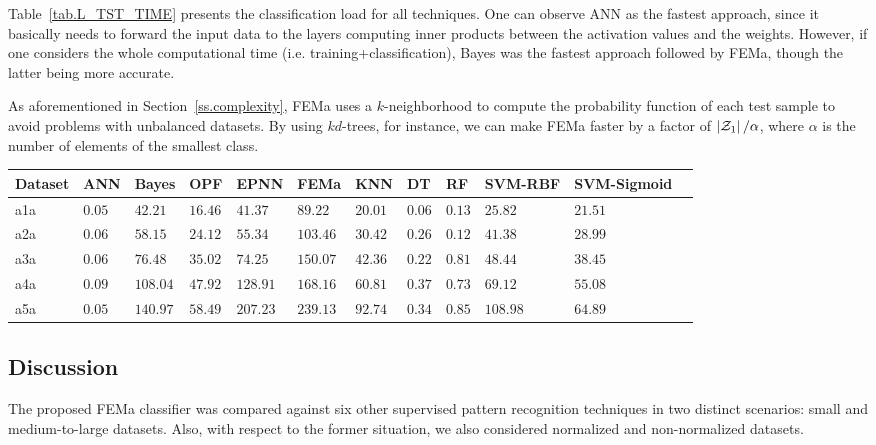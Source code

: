 Table~\ref{tab.L_TST_TIME} presents the classification load for all techniques. One can observe ANN as the fastest approach, since it basically needs to forward the input data to the layers computing inner products between the activation values and the weights. However, if one considers the whole computational time (i.e. training+classification), Bayes was the fastest approach followed by FEMa, though the latter being more accurate.

As aforementioned in Section~\ref{ss.complexity}, FEMa uses a $k$-neighborhood to compute the probability function of each test sample to avoid problems with unbalanced datasets. By using $kd$-trees, for instance, we can make FEMa faster by a factor of $\left|{\cal Z}_1\right|/\alpha$, where $\alpha$ is the number of elements of the smallest class.

\begin{table*}[!htb]
\begin{center}
\caption{\label{tab.L_TST_TIME}Testing time concerning the medium-to-large datasets.}
\scriptsize
\begin{tabular}{l||lllllllllll}
Dataset & ANN   & Bayes     & OPF     & EPNN     & FEMa     & KNN     &      DT  &  RF    & SVM-RBF & SVM-Sigmoid     \\ \hline \hline
a1a& $ 0.05$    & $ 42.21$  & $ 16.46$& $ 41.37$ & $ 89.22$ & $ 20.01$& $0.06$   & $0.13$ & $ 25.82$& $21.51$  \\ 
a2a& $ 0.06$    & $ 58.15$  & $ 24.12$& $ 55.34$ & $ 103.46$& $ 30.42$& $0.26$   & $0.12$ & $ 41.38$& $28.99$ \\ 
a3a& $ 0.06$    & $ 76.48$  & $ 35.02$& $ 74.25$ & $ 150.07$& $ 42.36$& $0.22$   & $0.81$ &$ 48.44$ & $38.45$\\ 
a4a& $ 0.09$    & $ 108.04$ & $ 47.92$& $ 128.91$& $ 168.16$& $ 60.81$& $0.37$   & $0.73$ &$ 69.12$ & $55.08$\\ 
a5a& $ 0.05$    & $ 140.97$ & $ 58.49$& $ 207.23$& $ 239.13$& $ 92.74$& $0.34$   & $0.85$ & $108.98$& $64.89$\\ \hline
\end{tabular}
\end{center}
\end{table*}

\subsection{Discussion}
\label{ss.discussion}

The proposed FEMa classifier was compared against six other supervised pattern recognition techniques in two distinct scenarios: small and medium-to-large datasets. Also, with respect to the former situation, we also considered normalized and non-normalized datasets.

